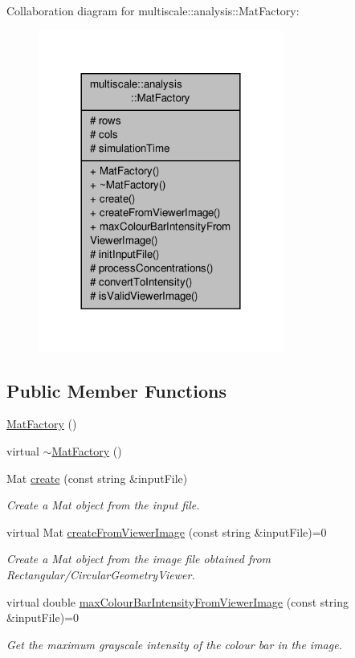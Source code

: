 Collaboration diagram for multiscale\-:\-:analysis\-:\-:Mat\-Factory\-:\nopagebreak
\begin{figure}[H]
\begin{center}
\leavevmode
\includegraphics[width=228pt]{classmultiscale_1_1analysis_1_1MatFactory__coll__graph}
\end{center}
\end{figure}
\subsection*{Public Member Functions}
\begin{DoxyCompactItemize}
\item 
\hyperlink{classmultiscale_1_1analysis_1_1MatFactory_a454ca2abfbeb664e75f5365ac00eacff}{Mat\-Factory} ()
\item 
virtual \hyperlink{classmultiscale_1_1analysis_1_1MatFactory_aa339532cb504caebcf9ece2c847f4847}{$\sim$\-Mat\-Factory} ()
\item 
Mat \hyperlink{classmultiscale_1_1analysis_1_1MatFactory_a7800a989d808037fe96a9d5a692909b0}{create} (const string \&input\-File)
\begin{DoxyCompactList}\small\item\em Create a Mat object from the input file. \end{DoxyCompactList}\item 
virtual Mat \hyperlink{classmultiscale_1_1analysis_1_1MatFactory_a719ca9ac925ee182c1d5df1b0b029394}{create\-From\-Viewer\-Image} (const string \&input\-File)=0
\begin{DoxyCompactList}\small\item\em Create a Mat object from the image file obtained from Rectangular/\-Circular\-Geometry\-Viewer. \end{DoxyCompactList}\item 
virtual double \hyperlink{classmultiscale_1_1analysis_1_1MatFactory_a041b354357794476a2108e3f71deadc8}{max\-Colour\-Bar\-Intensity\-From\-Viewer\-Image} (const string \&input\-File)=0
\begin{DoxyCompactList}\small\item\em Get the maximum grayscale intensity of the colour bar in the image. \end{DoxyCompactList}\end{DoxyCompactItemize}
